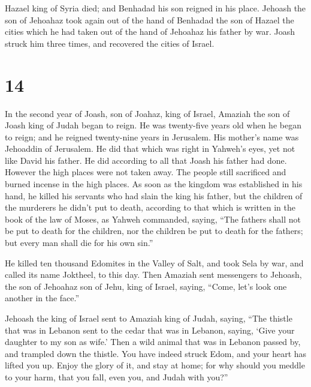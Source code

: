  Hazael king of Syria died; and Benhadad his son reigned
in his place.  Jehoash the son of Jehoahaz took again out
of the hand of Benhadad the son of Hazael the cities which he had taken
out of the hand of Jehoahaz his father by war. Joash struck him three
times, and recovered the cities of Israel.

\hypertarget{section-13}{%
\section{14}\label{section-13}}

 In the second year of Joash, son of Joahaz, king of
Israel, Amaziah the son of Joash king of Judah began to reign.
 He was twenty-five years old when he began to reign; and
he reigned twenty-nine years in Jerusalem. His mother's name was
Jehoaddin of Jerusalem.  He did that which was right in
Yahweh's eyes, yet not like David his father. He did according to all
that Joash his father had done.  However the high places
were not taken away. The people still sacrificed and burned incense in
the high places.  As soon as the kingdom was established
in his hand, he killed his servants who had slain the king his father,
 but the children of the murderers he didn't put to death,
according to that which is written in the book of the law of Moses, as
Yahweh commanded, saying, ``The fathers shall not be put to death for
the children, nor the children be put to death for the fathers; but
every man shall die for his own sin.''

 He killed ten thousand Edomites in the Valley of Salt,
and took Sela by war, and called its name Joktheel, to this day.
 Then Amaziah sent messengers to Jehoash, the son of
Jehoahaz son of Jehu, king of Israel, saying, ``Come, let's look one
another in the face.''

 Jehoash the king of Israel sent to Amaziah king of Judah,
saying, ``The thistle that was in Lebanon sent to the cedar that was in
Lebanon, saying, `Give your daughter to my son as wife.' Then a wild
animal that was in Lebanon passed by, and trampled down the thistle.
 You have indeed struck Edom, and your heart has lifted
you up. Enjoy the glory of it, and stay at home; for why should you
meddle to your harm, that you fall, even you, and Judah with you?''

